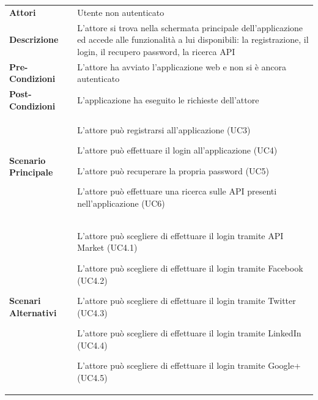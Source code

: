 \renewcommand*{\arraystretch}{1.6}
\begin{longtable}{ l | p{11cm}}
	\hline
	\rowcolor{Gray}
	\multicolumn{2}{c}{UC1 - Main pre-autenticazione} \\
	\hline
	\textbf{Attori} & Utente non autenticato  \\
	\textbf{Descrizione} & L'attore si trova nella schermata principale dell'applicazione ed accede alle funzionalità a lui disponibili: la registrazione, il login, il recupero password, la ricerca API \\
	\textbf{Pre-Condizioni} & L'attore ha avviato l'applicazione web e non si è ancora autenticato \\
	\textbf{Post-Condizioni} & L'applicazione ha eseguito le richieste dell'attore \\
	\textbf{Scenario Principale} & 
	\begin{enumerate*}[label=(\arabic*.),itemjoin={\newline}]
		\item L'attore può registrarsi all'applicazione (UC3)
		\item L'attore può effettuare il login all'applicazione (UC4)
		\item L'attore può recuperare la propria password (UC5)
		\item L'attore può effettuare una ricerca sulle API presenti nell'applicazione (UC6)
	\end{enumerate*}\\
	\textbf{Scenari Alternativi} & 
	\begin{enumerate*}[label=(\arabic*.),itemjoin={\newline}]
		\item L'attore può scegliere di effettuare il login tramite API Market (UC4.1)
		\item L'attore può scegliere di effettuare il login tramite Facebook (UC4.2)
		\item L'attore può scegliere di effettuare il login tramite Twitter (UC4.3)
		\item L'attore può scegliere di effettuare il login tramite LinkedIn (UC4.4)
		\item L'attore può scegliere di effettuare il login tramite Google+ (UC4.5)
	\end{enumerate*}\\
\end{longtable}